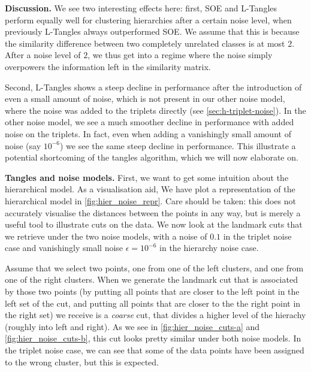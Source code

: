 \textbf{Discussion.}
We see two interesting effects here: first, SOE and L-Tangles perform equally well for clustering hierarchies after a certain noise level, when previously L-Tangles always outperformed
SOE. We assume that this is because the similarity difference between two completely unrelated classes is at most $2$. After a noise level 
of $2$, we thus get into a regime where the noise simply overpowers the information left in the similarity matrix.

Second, L-Tangles shows a steep decline in performance after the introduction of even a small amount of noise, which is not present in our other noise model, 
where the noise was added to the triplets directly (see \autoref{sec:h-triplet-noise}).
In the other noise model, we see a much smoother decline in performance with added noise on the triplets. 
In fact, even when adding a vanishingly small amount of noise (say $10^{-6}$) we see the same steep decline in performance. 
This illustrate a potential shortcoming of the tangles algorithm, which we will now elaborate on.

\textbf{Tangles and noise models.}
First, we want to get some intuition about the hierarchical model.
As a visualisation aid, We have plot a representation of the hierarchical model in \autoref{fig:hier_noise_repr}. Care should be taken: this does not accurately visualise the distances between
the points in any way, but is merely a useful tool to illustrate cuts on the data. We now look at the landmark cuts that we retrieve under the two noise models, with a noise of $0.1$ in the triplet 
noise case and vanishingly small noise $\epsilon = 10^{-6}$ in the hierarchy noise case. 

Assume that we select two points, one from one of the left clusters, and one from one of the right clusters. When we generate the landmark cut that is associated by those two points
(by putting all points that are closer to the left point in the left set of the cut, and putting all points that are closer to the the right point in the right set) 
we receive is a \textit{coarse} cut, that divides a higher level of the hierachy (roughly into left and right). As we see in \autoref{fig:hier_noise_cuts-a} and \autoref{fig:hier_noise_cuts-b}, 
this cut looks pretty similar under both noise models. 
In the triplet noise case, we can see that  some of the data points have been assigned to the wrong cluster, but this is expected. 

